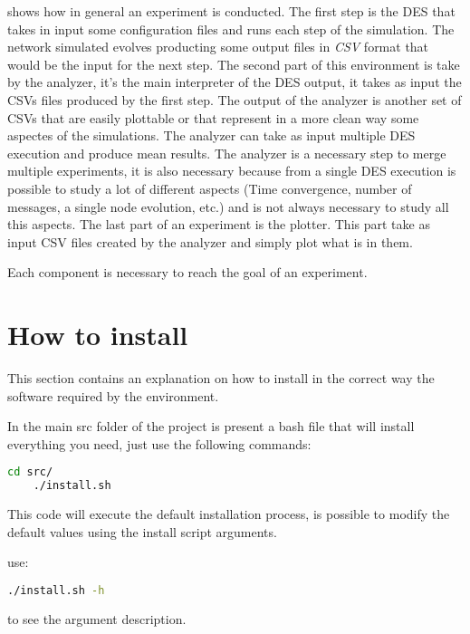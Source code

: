 \documentclass[10pt,journal,onecolumn]{IEEEtran}
\begin{document}
 shows how in general an experiment is conducted.
The first step is the \ac{DES} that takes in input some configuration files
and runs each step of the simulation.
The network simulated evolves producting some output files in \textit{CSV} format
that would be the input for the next step.
The second part of this environment is take by the analyzer, it's the main
interpreter of the \ac{DES} output, it takes as input the CSVs files produced
by the first step. The output of the analyzer is another set of CSVs that are
easily plottable or that represent in a more clean way some aspectes of the simulations.
The analyzer can take as input multiple \ac{DES} execution and produce mean
results.
The analyzer is a necessary step to merge multiple experiments, it is also
necessary because from a single \ac{DES} execution is possible to study
a lot of different aspects (Time convergence, number of messages, a single node
evolution, etc.) and is not always necessary to study all this aspects.
The last part of an experiment is the plotter.
This part take as input CSV files created by the analyzer and simply plot what
is in them.

Each component is necessary to reach the goal of an experiment.

\section{How to install}
\label{sec:installation}

This section contains an explanation on how to install in the correct
way the software required by the environment.

In the main src folder of the project is present a bash file that will install
everything you need, just use the following commands:

\lstset{style=shell}
\begin{lstlisting}[language=bash]
	cd src/
	./install.sh
\end{lstlisting}

This code will execute the default installation process, is possible to modify the default
values using the install script arguments.

use: 
\begin{lstlisting}[language=bash]
	./install.sh -h
\end{lstlisting}
to see the argument description.
\end{document}
